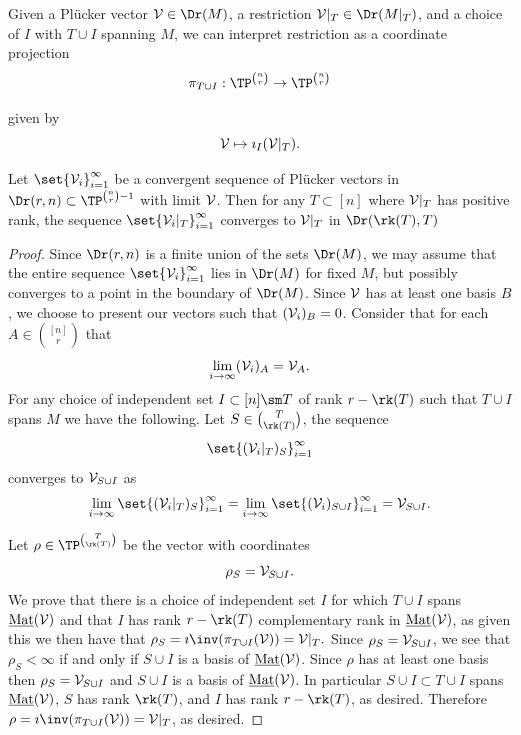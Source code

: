  Given a Pl\"ucker vector $\sV\in \Dr(M)$, a restriction $\sV|_T\in \Dr(M|_{T})$, and a choice of $I$ with $T\cup I$ spanning $M$, we can interpret restriction as a coordinate projection 
 $$\pi_{T\cup I}: \TP^{\binom{n}{r}}\to \TP^{\binom{n}{r}}$$
 
 given by
$$\mathcal{V}\mapsto \imath_I(\mathcal{V}|_T).$$


\begin{proposition}\label{prop:plConvergence}
Let $\set{\sV_i}_{i=1}^\infty$ be a convergent sequence of Pl\"ucker vectors in $\Dr(r,n)\subset \TP^{\binom{n}{r}-1}$ with limit $\mathcal{V}$. Then for any $T\subset [n]$ where $\mathcal{V}|_T$ has positive rank, the sequence $\set{\sV_i|_T}_{i=1}^\infty$ converges to $\mathcal{V}|_T$ in $\Dr(\rk(T), T)$
\end{proposition}
\begin{proof}
 Since $\Dr(r,n)$ is a finite union of the sets $\Dr(M)$, we may assume that the entire sequence $\set{\sV_i}_{i=1}^\infty$ lies in $\Dr(M)$ for fixed $M$, but possibly converges to a point in the boundary of $\Dr(M)$.  Since $\mathcal{V}$ has at least one basis $B$, we choose to present our vectors such that $(\mathcal{V}_i)_B = 0$. 
 Consider that for each $A\in \binom{[n]}{r}$ that 
 $$\lim_{i\to \infty} (\mathcal{V}_i)_A = \mathcal{V}_A.$$
 For any choice of independent set $I\subset [n]\sm T$ of rank $r-\rk(T)$ such that $T\cup I$ spans $M$ we have the following. Let $S\in \binom{T}{\rk(T)}$, the sequence
 $$\set{(\sV_i|_{T})_S}_{i=1}^\infty$$ 
 converges to $\mathcal{V}_{S\cup I}$ as
 $$\lim_{i\to\infty}\set{(\sV_i|_{T})_S}_{i=1}^\infty=\lim_{i\to\infty}\set{(\sV_i)_{S\cup I}}_{i=1}^\infty=\sV_{S\cup I}.$$
 
Let $\rho\in \TP^{\binom{T}{\rk(T)}}$ be the vector with coordinates 
$$\rho_S = \mathcal{V}_{S\cup I}.$$
We prove that there is a choice of independent set $I$ for which $T\cup I$ spans $\operatorname{\underline{Mat}}(\mathcal{V})$ and that $I$ has rank $r-\rk(T)$ complementary rank in $\operatorname{\underline{Mat}}(\mathcal{V})$, as given this we then have that $\rho_S = \imath\inv(\pi_{T\cup I}(\sV))= \sV|_T.$ Since $\rho_S = \mathcal{V}_{S\cup I}$, we see that $\rho_S<\infty$ if and only if $S\cup I$ is a basis of $\operatorname{\underline{Mat}}(\mathcal{V})$. Since $\rho$ has at least one basis then $\rho_S = \mathcal{V}_{S\cup I}$ and $S\cup I$ is a basis of $\operatorname{\underline{Mat}}(\mathcal{V})$. In particular $S\cup I\subset T\cup I$ spans $\operatorname{\underline{Mat}}(\mathcal{V})$, $S$ has rank $\rk(T)$, and $I$ has rank $r-\rk(T)$, as desired. Therefore $\rho = \imath\inv(\pi_{T\cup I}(\sV)) = \sV|_T$, as desired.
\end{proof}



